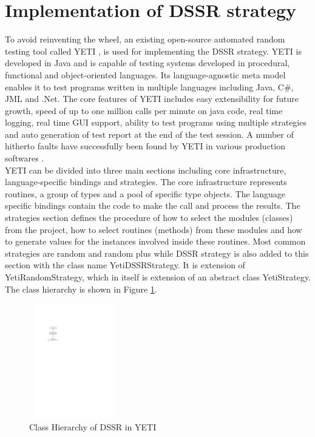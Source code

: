 \documentclass[conference]{IEEEtran}
\begin{document}
\section{Implementation of DSSR strategy}\label{sec:imp}
To avoid reinventing the wheel, an existing open-source automated random testing tool called YETI \cite{Oriol2011}, \cite{Oriol2012} is used for implementing the DSSR strategy. YETI is developed in Java and is capable of testing systems developed in procedural, functional and object-oriented languages. Its language-agnostic meta model enables it to test programs written in multiple languages including Java, C\#, JML and .Net. The core features of YETI includes easy extensibility for future growth, speed of up to one million calls per minute on java code, real time logging, real time GUI support, ability to test programs using multiple strategies and auto generation of test report at the end of the test session. A number of hitherto faults have successfully been found by YETI in various production softwares \cite{Oriol2012}. \\
\indent YETI can be divided into three main sections including core infrastructure, language-specific bindings and strategies. The core infrastructure represents routines, a group of types and a pool of specific type objects. The language specific bindings contain the code to make the call and process the results. The strategies section defines the procedure of how to select the modules (classes) from the project, how to select routines (methods) from these modules and how to generate values for the instances involved inside these routines. Most common strategies are random and random plus while DSSR strategy is also added to this section with the class name YetiDSSRStrategy. It is extension of YetiRandomStrategy, which in itself is extension of an abstract class YetiStrategy. The class hierarchy is shown in Figure \ref{fig:hierarchyofDSSR}.

\begin{figure}[ht]
\centering
\includegraphics[width=4cm,height=5cm]{hierarchy.pdf}
\caption{Class Hierarchy of DSSR in YETI}
\label{fig:hierarchyofDSSR}
\end{figure}
\end{document}
